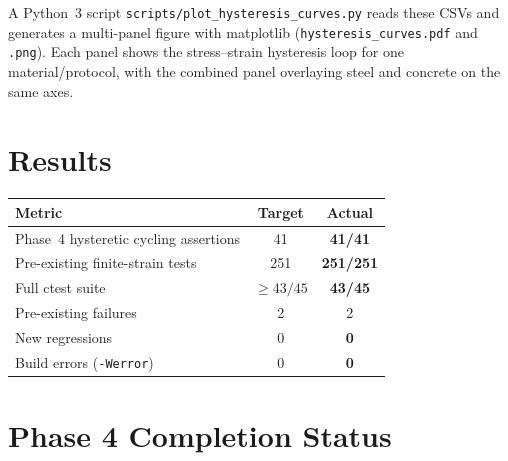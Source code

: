 A Python~3 script \texttt{scripts/plot\_hysteresis\_curves.py} reads
these CSVs and generates a multi-panel figure with matplotlib
(\texttt{hysteresis\_curves.pdf} and \texttt{.png}).  Each panel shows
the stress--strain hysteresis loop for one material/protocol, with the
combined panel overlaying steel and concrete on the same axes.


\section{Results}
\label{sec:phase4-results}

\begin{center}
\begin{tabular}{lcc}
  \toprule
  Metric & Target & Actual \\
  \midrule
  Phase~4 hysteretic cycling assertions & 41 & \textbf{41/41} \\
  Pre-existing finite-strain tests & 251 & \textbf{251/251} \\
  Full ctest suite & $\geq 43/45$ & \textbf{43/45} \\
  Pre-existing failures & 2 & 2 \\
  New regressions & 0 & \textbf{0} \\
  Build errors (\texttt{-Werror}) & 0 & \textbf{0} \\
  \bottomrule
\end{tabular}
\end{center}


\section{Phase 4 Completion Status}
\label{sec:phase4-completion}

